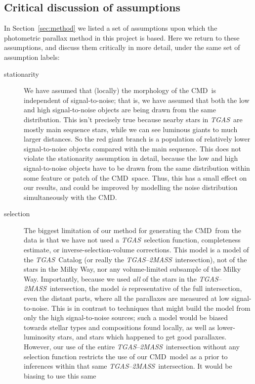 \documentclass[modern]{aastex61}
\newcommand{\acronym}[1]{{\small{#1}}}
\newcommand{\project}[1]{\textsl{#1}}
\newcommand{\tgas}{\project{\acronym{TGAS}}}
\newcommand{\tmass}{\project{\acronym{2MASS}}}
\newcommand{\cmd}{\acronym{CMD}}
\begin{document}
\subsection{Critical discussion of assumptions}

In Section~\ref{sec:method} we listed a set of assumptions upon which
the photometric parallax method in this project is based.
Here we return to these assumptions, and discuss them critically in more
detail, under the same set of assumption labels:
\begin{description}
\item[stationarity]
  We have assumed that (locally) the morphology of
  the \cmd\ is independent of signal-to-noise; that is, we have assumed that
  both the low and high
  signal-to-noise objects are being drawn from the same distribution.
  This isn't precisely true because nearby stars in \tgas\ are
  mostly main sequence stars, while we can see luminous giants to much larger
  distances. So the red giant branch is a population of
  relatively lower signal-to-noise objects compared with the main
  sequence. This does not violate the stationarity assumption in
  detail, because the low and high signal-to-noise objects have to be
  drawn from the same distribution within some feature or patch of the
  \cmd\ space. Thus, this has a small effect on our results, and could be improved by modelling the noise distribution simultaneously with the \cmd.
\item[selection] The biggest limitation of our method for generating
  the \cmd\ from the data is that we have not used a
  \tgas\ selection function, completeness estimate, or
  inverse-selection-volume corrections.  This model is a model of the
  \tgas\ Catalog (or really the \tgas--\tmass\ intersection), not of
  the stars in the Milky Way, nor any volume-limited subsample of the
  Milky Way.  Importantly, because we used \emph{all} of the stars in
  the \tgas--\tmass\ intersection, the model \emph{is} representative of
  the full intersection, even the distant parts, where all the
  parallaxes are measured at low signal-to-noise.  This is in contrast
  to techniques that might build the model from only the high
  signal-to-noise sources; such a model would be biased towards
  stellar types and compositions found locally, as well as
  lower-luminosity stars, and stars which happened to get good
  parallaxes.  However, our use of the entire
  \tgas--\tmass\ intersection without any selection function restricts
  the use of our \cmd\ model as a prior to inferences within that same
  \tgas--\tmass\ intersection.  It would be biasing to use this same

\end{description}
\end{document}
